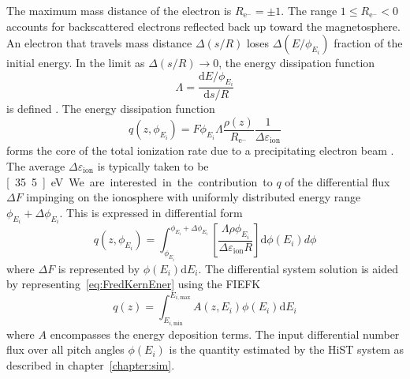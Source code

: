 The maximum mass distance of the electron is $R_{\textrm{e}^-} = \pm 1$. The range $1 \leq R_{\textrm{e}^-} < 0$ accounts for backscattered electrons reflected back up toward the magnetosphere. 
An electron that travels mass distance $\Delta(s/R)$ loses $\Delta(E/\phi_{E_i})$ fraction of the initial energy. 
In the limit as $\Delta(s/R) \rightarrow 0$, the energy dissipation function
\begin{equation}\label{eq:energyDissFunc}
\Lambda = \frac{\mathrm{d}E/\phi_{E_i} }{ \mathrm{d}s/R }
\end{equation}
is defined \citep{semeter2005}. 
The energy dissipation function 
\begin{equation}\label{eq:qioniz}
q\left( z,\phi_{E_i} \right) = F \phi_{E_i} \Lambda \frac{\rho(z)}{R_{\textrm{e}^-}} \frac{1}{\Delta\varepsilon_{\textrm{ion}}}
\end{equation}
forms the core of the total ionization rate due to a precipitating electron beam \citep{rees1989}.
The average $\Delta\varepsilon_{\textrm{ion}}$ is typically taken \citep{semeter2005} to be \unit[35.5]{eV}.

We are interested in the contribution to $q$ of the differential flux $\Delta F$ impinging on the ionosphere with uniformly distributed energy range $\phi_{E_i} + \Delta\phi_{E_i}$. 
This is expressed in differential form \citep{semeter2005} 
\begin{equation}\label{eq:FredKernEner}
q\left( z,\phi_{E_i} \right) = \int_{\phi_{E_i}}^{\phi_{E_i}+\Delta\phi_{E_i}} \left[ \frac{\Lambda\rho\phi_{E_i} }{ \Delta\varepsilon_{\textrm{ion}} R } \right] \mathrm{d}\phi(E_i)d\phi
\end{equation}
where $\Delta F$ is represented by $\phi(E_i)\mathrm{d}E_i$. 
The differential system solution is aided by representing~\eqref{eq:FredKernEner} using the FIEFK
\begin{equation}\label{eq:JLSfiefk}
q(z) = \int_{E_{i,\textrm{min}}}^{E_{i,\textrm{max}}} A(z,E_i)\phi(E_i)\textrm{d}E_i
\end{equation}
where $A$ encompasses the energy deposition terms. 
The input differential number flux over all pitch angles $\phi(E_i)$ is the quantity estimated by the HiST system as described in chapter~\ref{chapter:sim}. 


\FloatBarrier
